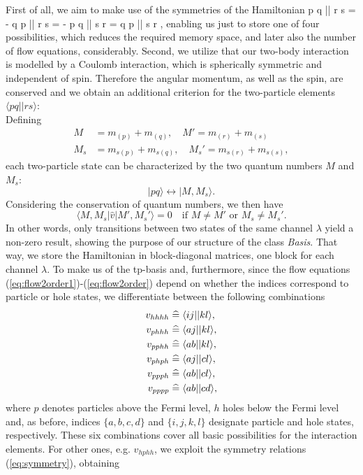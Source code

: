 First of all, we aim to make use of the symmetries of the Hamiltonian
\be
\langle p q || r s \rangle =  - \langle q p || r s \rangle = - \langle p q || s r \rangle = \langle q p || s r \rangle,
\label{eq:symmetry}
\ee
enabling us just to store one of four possibilities, which reduces the required memory space, and later also the number of flow equations, considerably. Second, we utilize that our two-body interaction is modelled by a Coulomb interaction, which is spherically symmetric and independent of spin. Therefore the angular momentum, as well as the spin, are conserved and we obtain an additional criterion for the two-particle elements $\langle p q || r s \rangle$:\\
Defining 
\begin{align*}
M &= m_{(p)} + m_{(q)}, \quad M' = m_{(r)} + m_{(s)}  \\
M_s &= m_{s(p)}+m_{s(q)}, \quad M_s' = m_{s(r)}+m_{s(s)},
\end{align*}
each two-particle state can be characterized by the two quantum numbers $M$ and $M_s$:
\[
| p q \rangle \leftrightarrow |M, M_s \rangle.
\]
Considering the conservation of quantum numbers, we then have
\[
\langle M,M_s | \hat{v}| M',M_s' \rangle = 0 \quad \text{if } M \neq M' \text{ or } M_s \neq M_s'.
\]
In other words, only transitions between two states of the same channel $\lambda$ yield a non-zero result, showing the purpose of our structure of the class \textit{Basis}. That way, we store the Hamiltonian in block-diagonal matrices, one block for each channel $\lambda$. To make us of the tp-basis and, furthermore, since the flow equations (\ref{eq:flow2order1})-(\ref{eq:flow2order}) depend on whether the indices correspond to particle or hole states, we differentiate between the following combinations
\begin{align}
v_{hhhh} &\corresp \langle i j |  | k l \rangle, \notag \\
v_{phhh} &\corresp \langle a j |  | k l \rangle, \notag \\
v_{pphh} &\corresp \langle a b |  | k l \rangle, \notag \\
v_{phph} &\corresp \langle a j |  | c l \rangle, \notag \\
v_{ppph} &\corresp \langle a b | | c l \rangle, \notag \\
v_{pppp} &\corresp \langle a b |  | c d \rangle,
\label{eq:vcombs}
\end{align}
where $p$ denotes particles above the Fermi level, $h$ holes below the Fermi level and, as before, indices $\lbrace a,b,c,d \rbrace$ and $\lbrace i,j,k,l\rbrace$ designate particle and hole states, respectively. These six combinations cover all basic possibilities for the interaction elements. For other ones, e.g. $v_{hphh}$, we exploit the symmetry relations (\ref{eq:symmetry}), obtaining
